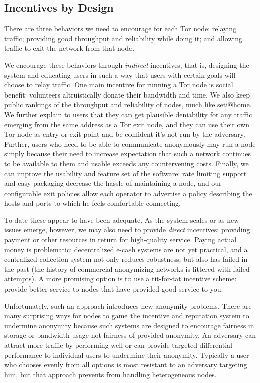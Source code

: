 \documentclass{llncs}
\begin{document}
\subsection{Incentives by Design}

There are three behaviors we need to encourage for each Tor node: relaying
traffic; providing good throughput and reliability while doing it;
and allowing traffic to exit the network from that node.

We encourage these behaviors through \emph{indirect} incentives, that
is, designing the system and educating users in such a way that users
with certain goals will choose to relay traffic.  One
main incentive for running a Tor node is social benefit: volunteers
altruistically donate their bandwidth and time.  We also keep public
rankings of the throughput and reliability of nodes, much like
seti@home.  We further explain to users that they can get plausible
deniability for any traffic emerging from the same address as a Tor
exit node, and they can use their own Tor node
as entry or exit point and be confident it's not run by the adversary.
Further, users who need to be able to communicate anonymously
may run a node simply because their need to increase
expectation that such a network continues to be available to them
and usable exceeds any countervening costs.
Finally, we can improve the usability and feature set of the software:
rate limiting support and easy packaging decrease the hassle of
maintaining a node, and our configurable exit policies allow each
operator to advertise a policy describing the hosts and ports to which
he feels comfortable connecting.

To date these appear to have been adequate. As the system scales or as
new issues emerge, however, we may also need to provide
 \emph{direct} incentives:
providing payment or other resources in return for high-quality service.
Paying actual money is problematic: decentralized e-cash systems are
not yet practical, and a centralized collection system not only reduces
robustness, but also has failed in the past (the history of commercial
anonymizing networks is littered with failed attempts).  A more promising
option is to use a tit-for-tat incentive scheme: provide better service
to nodes that have provided good service to you.

Unfortunately, such an approach introduces new anonymity problems.
There are many surprising ways for nodes to game the incentive and
reputation system to undermine anonymity because such systems are
designed to encourage fairness in storage or bandwidth usage not
fairness of provided anonymity. An adversary can attract more traffic
by performing well or can provide targeted differential performance to
individual users to undermine their anonymity. Typically a user who
chooses evenly from all options is most resistant to an adversary
targeting him, but that approach prevents from handling heterogeneous
nodes.
\end{document}
